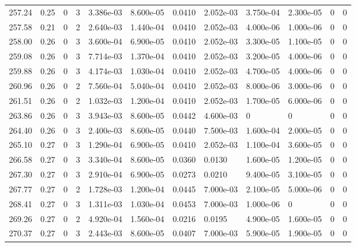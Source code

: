 \documentclass[preview]{standalone}
\begin{document}
{{{{{{{{{{\begin{tabular}{L{1.2cm}C{1.2cm} C{0.3cm}C{0.5cm} C{1.4cm}C{1.4cm} C{1.4cm}C{1.4cm} C{1.6cm}C{1.6cm} C{1.6cm}C{1.6cm}}
  257.24  &  0.25  & 0     &  3 &  3.386e-03  & 8.600e-05  &  0.0410&   2.052e-03& 3.750e-04 & 2.300e-05   &  0 & 0  \\ 
  257.58  &  0.21  & 0     &  2 &  2.640e-03  & 1.440e-04  &  0.0410&   2.052e-03& 4.000e-06 & 1.000e-06   &  0 & 0  \\ 
  258.00  &  0.26  & 0     &  3 &  3.600e-04  & 6.900e-05  &  0.0410&   2.052e-03& 3.300e-05 & 1.100e-05   &  0 & 0  \\ 
  259.08  &  0.26  & 0     &  3 &  7.714e-03  & 1.370e-04  &  0.0410&   2.052e-03& 3.200e-05 & 4.000e-06   &  0 & 0  \\ 
  259.88  &  0.26  & 0     &  3 &  4.174e-03  & 1.030e-04  &  0.0410&   2.052e-03& 4.700e-05 & 4.000e-06   &  0 & 0  \\ 
  260.96  &  0.26  & 0     &  2 &  7.560e-04  & 5.040e-04  &  0.0410&   2.052e-03& 8.000e-06 & 3.000e-06   &  0 & 0  \\ 
  261.51  &  0.26  & 0     &  2 &  1.032e-03  & 1.200e-04  &  0.0410&   2.052e-03& 1.700e-05 & 6.000e-06   &  0 & 0  \\ 
  263.86  &  0.26  & 0     &  3 &  3.943e-03  & 8.600e-05  &  0.0442&   4.600e-03& 0 & 0   &  0 & 0  \\ 
  264.40  &  0.26  & 0     &  3 &  2.400e-03  & 8.600e-05  &  0.0440&   7.500e-03& 1.600e-04 & 2.000e-05   &  0 & 0  \\ 
  265.10  &  0.27  & 0     &  3 &  1.290e-04  & 6.900e-05  &  0.0410&   2.052e-03& 1.100e-04 & 3.600e-05   &  0 & 0  \\ 
  266.58  &  0.27  & 0     &  3 &  3.340e-04  & 8.600e-05  &  0.0360&   0.0130& 1.600e-05 & 1.200e-05   &  0 & 0  \\ 
  267.30  &  0.27  & 0     &  3 &  2.910e-04  & 6.900e-05  &  0.0273&   0.0210& 9.400e-05 & 3.100e-05   &  0 & 0  \\ 
  267.77  &  0.27  & 0     &  2 &  1.728e-03  & 1.200e-04  &  0.0445&   7.000e-03& 2.100e-05 & 5.000e-06   &  0 & 0  \\ 
  268.41  &  0.27  & 0     &  3 &  1.311e-03  & 1.030e-04  &  0.0453&   7.000e-03& 1.000e-06 & 0   &  0 & 0  \\ 
  269.26  &  0.27  & 0     &  2 &  4.920e-04  & 1.560e-04  &  0.0216&   0.0195& 4.900e-05 & 1.600e-05   &  0 & 0  \\ 
  270.37  &  0.27  & 0     &  3 &  2.443e-03  & 8.600e-05  &  0.0407&   7.000e-03& 5.900e-05 & 1.900e-05   &  0 & 0  \\ 
\hline 
\end{tabular} 

}}}}}}}}}}
\end{document}
